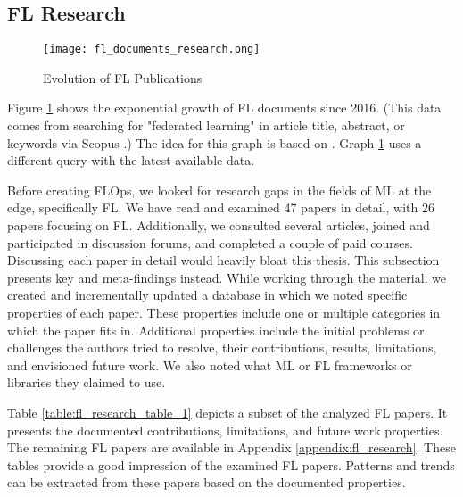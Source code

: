 
\subsection{FL Research}\label{subsection:fl_research}

\begin{figure}[h]
    \centering
    \texttt{[image: fl\_documents\_research.png]}
    \caption{Evolution of FL Publications}
    \label{fig:fl_documents_research}
\end{figure}

Figure \ref{fig:fl_documents_research} shows the exponential growth of FL documents since 2016.
(This data comes from searching for "federated learning" in article title, abstract, or keywords via Scopus \cite{scopus_homepage}.)
The idea for this graph is based on \cite{thesis:tum_fl_framework_comparison}.
Graph \ref{fig:fl_documents_research} uses a different query with the latest available data.

Before creating FLOps, we looked for research gaps in the fields of ML at the edge, specifically FL.
We have read and examined 47 papers in detail, with 26 papers focusing on FL. 
Additionally, we consulted several articles, joined and participated in discussion forums, and completed a couple of paid courses.
Discussing each paper in detail would heavily bloat this thesis.
This subsection presents key and meta-findings instead.
While working through the material, we created and incrementally updated a database in which we noted specific properties of each paper.
These properties include one or multiple categories in which the paper fits in.
Additional properties include the initial problems or challenges the authors tried to resolve, their contributions, results, limitations, and envisioned future work.
We also noted what ML or FL frameworks or libraries they claimed to use.

Table \ref{table:fl_research_table_1} depicts a subset of the analyzed FL papers.
It presents the documented contributions, limitations, and future work properties.
The remaining FL papers are available in Appendix \ref{appendix:fl_research}.
These tables provide a good impression of the examined FL papers.
Patterns and trends can be extracted from these papers based on the documented properties.

\begin{figure}[p]
    
\end{figure}


